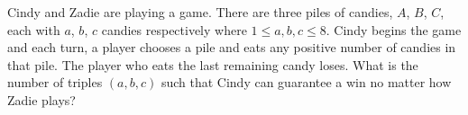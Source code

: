 Cindy and Zadie are playing a game. There are three piles of candies, $A$, $B$, $C$, each with $a$, $b$, $c$ candies respectively where $1\leq a,b,c\leq 8$. Cindy begins the game and each turn, a player chooses a pile and eats any positive number of candies in that pile. The player who eats the last remaining candy loses. What is the number of triples $(a,b,c)$ such that Cindy can guarantee a win no matter how Zadie plays?
